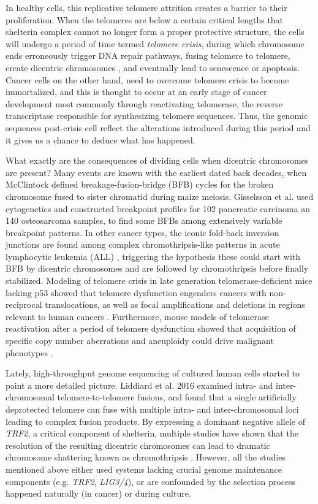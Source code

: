 \documentclass[phd,tocprelim]{cornell}
\begin{document}
In healthy cells, this replicative telomere attrition creates a barrier to their proliferation. When the telomeres are below a certain critical lengths that shelterin complex cannot no longer form a proper protective structure, the cells will undergo a period of time termed \textit{telomere crisis}, during which chromosome ends erroneously trigger DNA repair pathways, fusing telomere to telomere, create dicentric chromosomes \cite{Artandi2000-ab,Maciejowski2017-kx}, and eventually lead to senescence or apoptosis. Cancer cells on the other hand, need to overcome telomere crisis to become immortalized, and this is thought to occur at an early stage of cancer development \cite{Shay2005-fb} most commonly through reactivating telomerase, the reverse transcriptase responsible for synthesizing telomere sequences. Thus, the genomic sequences post-crisis cell reflect the alterations introduced during this period and it gives us a chance to deduce what has happened.

What exactly are the consequences of dividing cells when dicentric chromosomes are present? Many events are known with the earliest dated back decades, when McClintock \cite{McClintock1939-oi} defined breakage-fusion-bridge (BFB) cycles for the broken chromosome fused to sister chromatid during maize meiosis. Gisselsson et al. \cite{Gisselsson2001-hq} used cytogenetics and constructed breakpoint profiles for 102 pancreatic carcinoma an 140 osteosarcoma samples, to find some BFBs among extensively variable breakpoint patterns. In other cancer types, the iconic fold-back inversion junctions are found among complex chromothripsis-like patterns in acute lymphocytic leukemia (ALL) \cite{Li2014-mj}, triggering the hypothesis these could start with BFB by dicentric chromosomes and are followed by chromothripsis before finally stabilized. Modeling of telomere crisis in late generation telomerase-deficient mice lacking p53 showed that telomere dysfunction engenders cancers with non-reciprocal translocations, as well as focal amplifications and deletions in regions relevant to human cancers \cite{Artandi2000-ab,OHagan2002-rg}. Furthermore, mouse models of telomerase reactivation after a period of telomere dysfunction showed that acquisition of specific copy number aberrations and aneuploidy could drive malignant phenotypes \cite{Ding2012-at}.

Lately, high-throughput genome sequencing of cultured human cells started to paint a more detailed picture. Liddiard et al. 2016 \cite{Liddiard2016-ay} examined intra- and inter-chromosomal telomere-to-telomere fusions, and found that a single artificially deprotected telomere can fuse with multiple intra- and inter-chromosomal loci leading to complex fusion products. By expressing a dominant negative allele of \textit{TRF2}, a critical component of shelterin, multiple studies have shown that the resolution of the resulting dicentric chromosomes can lead to dramatic chromosome shattering known as chromothripsis \cite{maciejowski2015,Umbreit2020-kr,Maciejowski2020-bw}. However, all the studies mentioned above either used systems lacking crucial genome maintenance components (e.g. \textit{TRF2}, \textit{LIG3/4}), or are confounded by the selection process happened naturally (in cancer) or during culture.
\end{document}
